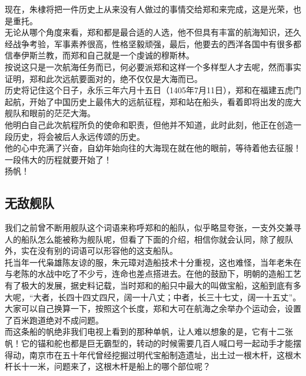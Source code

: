 \begin{multicols}{\theparacolNo}
现在，朱棣将把一件历史上从来没有人做过的事情交给郑和来完成，这是光荣，也是重托。\\

无论从哪个角度来看，郑和都是最合适的人选，他不但具有丰富的航海知识，还久经战争考验，军事素养很高，性格坚毅顽强，最后，他要去的西洋各国中有很多都信奉伊斯兰教，而郑和自己就是一个虔诚的穆斯林。\\

按说这只是一次航海任务而已，何必要派郑和这样一个多样型人才去呢，然而事实证明，郑和此次远航要面对的，绝不仅仅是大海而已。\\

历史将记住这个日子，永乐三年六月十五日（1405年7月11日），郑和在福建五虎门起航，开始了中国历史上最伟大的远航征程，郑和站在船头，看着即将出发的庞大舰队和眼前的茫茫大海。\\

他明白自己此次航程所负的使命和职责，但他并不知道，此时此刻，他正在创造一段历史，将会被后人永远传颂的历史。\\

他的心中充满了兴奋，自幼年始向往的大海现在就在他的眼前，等待着他去征服！一段伟大的历程就要开始了！\\

扬帆！\\

\subsection{无敌舰队}
我们之前曾不断用舰队这个词语来称呼郑和的船队，似乎略显夸张，一支外交兼寻人的船队怎么能被称为舰队呢，但看了下面的介绍，相信你就会认同，除了舰队外，实在没有别的词语可以形容他的这支船队。\\

托当年一代枭雄陈友谅的服，朱元璋对造船技术十分重视，这也难怪，当年老朱在与老陈的水战中吃了不少亏，连命也差点搭进去。在他的鼓励下，明朝的造船工艺有了极大的发展，据史料记载，当时郑和的船只中最大的叫做宝船，这船到底有多大呢，“大者，长四十四丈四尺，阔一十八丈；中者，长三十七丈，阔一十五丈”。大家可以自己换算一下，按照这个长度，郑和大可在航海之余举办个运动会，设置了百米跑道绝对不成问题。\\

而这条船的帆绝非我们电视上看到的那种单帆，让人难以想象的是，它有十二张帆！它的锚和舵也都是巨无霸型的，转动的时候需要几百人喊口号一起动手才能摆得动，南京市在五十年代曾经挖掘过明代宝船制造遗址，出土过一根木杆，这根木杆长十一米，问题来了，这根木杆是船上的哪个部位呢？\\


\end{multicols}
